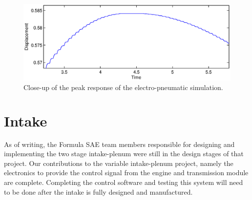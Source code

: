 \begin{figure}[H]
 \centering
 \includegraphics[width=5in,keepaspectratio]{results/figures/electro-pneumatic_simulation_plot2.eps}
 \caption{Close-up of the peak response of the electro-pneumatic simulation.}
 \label{fig:pneumatic_sim_zoom}
\end{figure}

\section{Intake}

As of writing, the Formula SAE team members responsible for designing and implementing the two stage intake-plenum were still in the design stages of that project. Our contributions to the variable intake-plenum project, namely the electronics to provide the control signal from the engine and transmission module are complete. Completing the control software and testing this system will need to be done after the intake is fully designed and manufactured.
